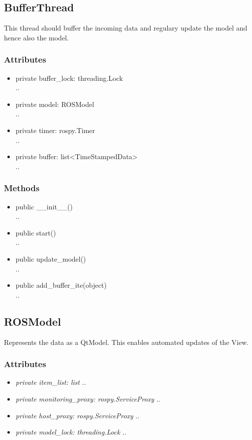 \subsection{BufferThread}
This thread should buffer the incoming data and regulary update the model and
hence also the model.
\subsubsection{Attributes}
\begin{itemize}
  \item private buffer\_lock: threading.Lock\\
  ..
  \item private model: ROSModel\\
  ..
  \item private timer: rospy.Timer\\
  ..
  \item private buffer: list<TimeStampedData>\\
  ..
\end{itemize}
\subsubsection{Methods}
\begin{itemize}
  \item public \_\_init\_\_()\\
  ..
  \item public start()\\
  ..
  \item public update\_model()\\
  ..
  \item public add\_buffer\_ite(object)\\
  ..
\end{itemize}

\subsection{ROSModel}
Represents the data as a QtModel. This enables automated updates of the View.
\subsubsection{Attributes}
\begin{itemize}
  \item \textit{private item\_list: list}
  ..
  \item \textit{private monitoring\_proxy: rospy.ServiceProxy}
  ..
  \item \textit{private host\_proxy: rospy.ServiceProxy}
  ..  
  \item \textit{private model\_lock: threading.Lock}
  ..
\end{itemize}
